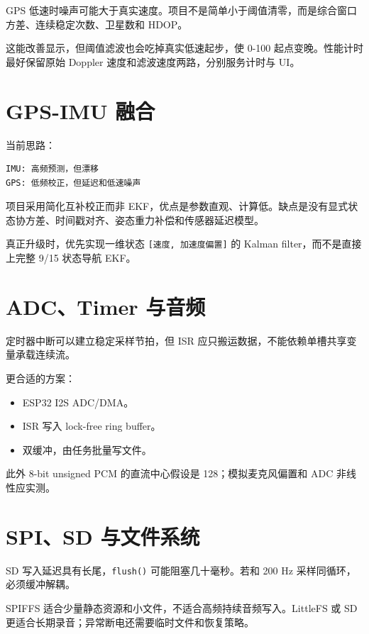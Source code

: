 \documentclass[
  UTF8,11pt,a4paper]{ctexart}
\newcommand{\passthrough}[1]{#1}
\providecommand{\tightlist}{%
  \setlength{\itemsep}{0pt}\setlength{\parskip}{0pt}}
\begin{document}
GPS
低速时噪声可能大于真实速度。项目不是简单小于阈值清零，而是综合窗口方差、连续稳定次数、卫星数和
HDOP。

这能改善显示，但阈值滤波也会吃掉真实低速起步，使 0-100
起点变晚。性能计时最好保留原始 Doppler
速度和滤波速度两路，分别服务计时与 UI。

\section{GPS-IMU 融合}\label{gps-imu-ux878dux5408}

当前思路：

\begin{lstlisting}
IMU: 高频预测，但漂移
GPS: 低频校正，但延迟和低速噪声
\end{lstlisting}

项目采用简化互补校正而非
EKF，优点是参数直观、计算低。缺点是没有显式状态协方差、时间戳对齐、姿态重力补偿和传感器延迟模型。

真正升级时，优先实现一维状态
\passthrough{\lstinline![速度, 加速度偏置]!} 的 Kalman
filter，而不是直接上完整 9/15 状态导航 EKF。

\section{ADC、Timer 与音频}\label{adctimer-ux4e0eux97f3ux9891}

定时器中断可以建立稳定采样节拍，但 ISR
应只搬运数据，不能依赖单槽共享变量承载连续流。

更合适的方案：

\begin{itemize}
\tightlist
\item
  ESP32 I2S ADC/DMA。
\item
  ISR 写入 lock-free ring buffer。
\item
  双缓冲，由任务批量写文件。
\end{itemize}

此外 8-bit unsigned PCM 的直流中心假设是 128；模拟麦克风偏置和 ADC
非线性应实测。

\section{SPI、SD 与文件系统}\label{spisd-ux4e0eux6587ux4ef6ux7cfbux7edf}

SD 写入延迟具有长尾，\passthrough{\lstinline!flush()!}
可能阻塞几十毫秒。若和 200 Hz 采样同循环，必须缓冲解耦。

SPIFFS 适合少量静态资源和小文件，不适合高频持续音频写入。LittleFS 或 SD
更适合长期录音；异常断电还需要临时文件和恢复策略。
\end{document}
